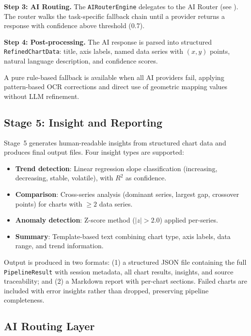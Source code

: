 \textbf{Step 3: AI Routing.}
The \texttt{AIRouterEngine} delegates to the AI Router (see ).
The router walks the task-specific fallback chain until a provider returns a response
with confidence above threshold (0.7).

\textbf{Step 4: Post-processing.}
The AI response is parsed into structured \texttt{RefinedChartData}: title, axis labels,
named data series with $(x, y)$ points, natural language description, and confidence
scores.

A pure rule-based fallback is available when all AI providers fail, applying pattern-based
OCR corrections and direct use of geometric mapping values without LLM refinement.

\subsection{Stage 5: Insight and Reporting}

Stage~5 generates human-readable insights from structured chart data and produces
final output files. Four insight types are supported:

\begin{itemize}
    \item \textbf{Trend detection}: Linear regression slope classification
          (increasing, decreasing, stable, volatile), with $R^2$ as confidence.
    \item \textbf{Comparison}: Cross-series analysis (dominant series, largest gap,
          crossover points) for charts with $\geq 2$ data series.
    \item \textbf{Anomaly detection}: Z-score method ($|z| > 2.0$) applied per-series.
    \item \textbf{Summary}: Template-based text combining chart type, axis labels,
          data range, and trend information.
\end{itemize}

Output is produced in two formats: (1) a structured JSON file containing the full
\texttt{PipelineResult} with session metadata, all chart results, insights, and
source traceability; and (2) a Markdown report with per-chart sections. Failed charts
are included with error insights rather than dropped, preserving pipeline completeness.

\subsection{AI Routing Layer}
\label{sec:ai_routing}

